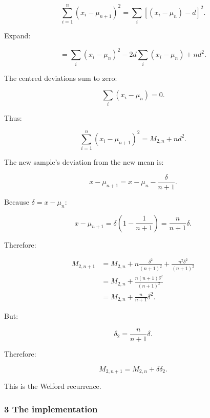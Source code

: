 \[
 \sum_{i=1}^{n}(x_i-\mu_{n+1})^2 = \sum_i[(x_i-\mu_n)-d]^2.
\]

Expand:

\[
 = \sum_i(x_i-\mu_n)^2 - 2d\sum_i(x_i-\mu_n) + nd^2.
\]

The centred deviations sum to zero:

\[
 \sum_i(x_i-\mu_n)=0.
\]

Thus:

\[
 \sum_{i=1}^{n}(x_i-\mu_{n+1})^2 = M_{2,n}+nd^2.
\]

The new sample's deviation from the new mean is:

\[
 x-\mu_{n+1} = x-\mu_n-\frac{\delta}{n+1}.
\]

Because \(\delta=x-\mu_n\):

\[
 x-\mu_{n+1} = \delta\left(1-\frac1{n+1}\right) = \frac{n}{n+1}\delta.
\]

Therefore:

\[
 \begin{aligned} M_{2,n+1} &= M_{2,n} +n\frac{\delta^2}{(n+1)^2} +\frac{n^2\delta^2}{(n+1)^2}\\ &= M_{2,n} +\frac{n(n+1)\delta^2}{(n+1)^2}\\ &= M_{2,n}+\frac{n}{n+1}\delta^2. \end{aligned}
\]

But:

\[
 \delta_2=\frac{n}{n+1}\delta.
\]

Therefore:

\[
 \boxed{ M_{2,n+1} = M_{2,n}+\delta\delta_2 }.
\]

This is the Welford recurrence.

\subsubsection{3 The implementation}\label{02-foundations-ii-ch030-the-implementation}

